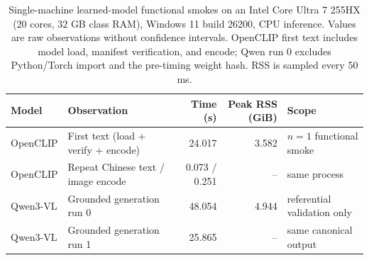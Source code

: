 \begin{table}[t]
\centering
\caption{Single-machine learned-model functional smokes on an Intel Core Ultra 7 255HX (20 cores, 32 GB class RAM), Windows 11 build 26200, CPU inference. Values are raw observations without confidence intervals. OpenCLIP first text includes model load, manifest verification, and encode; Qwen run 0 excludes Python/Torch import and the pre-timing weight hash. RSS is sampled every 50 ms.}
\label{tab:model-backed-runtime-integrity}
\small
\setlength{\tabcolsep}{4pt}
\begin{tabular}{llrrl}
\toprule
Model & Observation & Time (s) & Peak RSS (GiB) & Scope \\
\midrule
OpenCLIP & First text (load + verify + encode) & 24.017 & 3.582 & $n=1$ functional smoke \\
OpenCLIP & Repeat Chinese text / image encode & 0.073 / 0.251 & -- & same process \\
Qwen3-VL & Grounded generation run 0 & 48.054 & 4.944 & referential validation only \\
Qwen3-VL & Grounded generation run 1 & 25.865 & -- & same canonical output \\
\bottomrule
\end{tabular}
\end{table}
